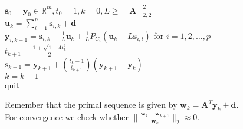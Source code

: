 \documentclass{beamer}
\begin{document}
\begin{frame}

\justifying
\begin{algorithm}[H]
			$\mathbf{s}_{0} = \mathbf{y}_{0} \in \mathbb{R}^{m}, t_{0} = 1, k = 0, L \geq \|\mathbf{A}\|_{2,2}^{2}$\\
			{
				$\mathbf{u}_{k} = \sum_{i=1}^{p} {\mathbf{s}_{i,k}} +\mathbf{d} $\\
				$\mathbf{y}_{i,k+1} = \mathbf{s}_{i,k} - \frac{1}{L} \mathbf{u}_{k} + \frac{1}{L} P_{C_i}(\mathbf{u}_{k} - L\mathbf{s}_{i,l})$ for $i = 1,2,\dots,p$\\
				$t_{k+1} = \frac{1 + \sqrt{1 + 4t_{k}^{2}}}{2}$\\
				$\mathbf{s}_{k+1} = \mathbf{y}_{k+1} + \left(\frac{t_{k}-1}{t_{k+1}}\right)(\mathbf{y}_{k+1} - \mathbf{y}_{k})$\\
				$k = k+1$\\
				{
					quit
				}
			}
\end{algorithm}

\vspace{0.4cm}
\justifying
Remember that the primal sequence is given by $\mathbf{w}_{k} = \mathbf{A}^{T}\mathbf{y}_{k} + \mathbf{d}$.\\

\vspace{0.4cm}
\justifying
For convergence we check whether $\|\frac{\mathbf{w}_{k} - \mathbf{w}_{k+1}}{\mathbf{w}_{k}}\|_{2} \approx 0$.

\end{frame}
\end{document}
